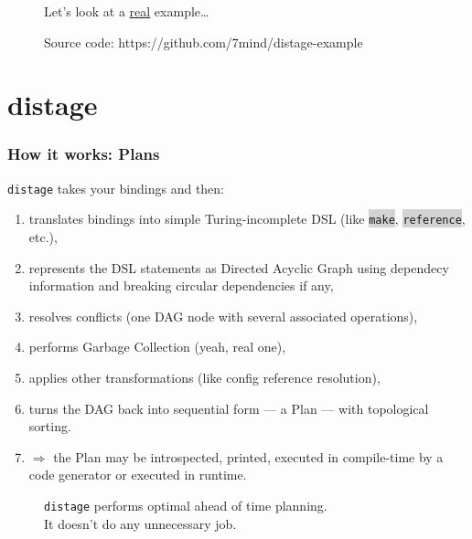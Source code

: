 \documentclass[usenames,dvipsnames,aspectratio=169]{beamer}
\newcommand{\code}[1]{\colorbox{lightgray}{\texttt{#1}}}
\newcommand{\distage}{\texttt{distage}\xspace}
\begin{document}
\begin{frame}
  \begin{figure}
  \Huge Let's look at a \underline{real} example\dots
  \end{figure}

  \begin{figure}
  Source code: https://github.com/7mind/distage-example
  \end{figure}
\end{frame}

\section{distage}
\begin{frame}
  \frametitle{How it works: Plans}
  \distage takes your bindings and then:
  \begin{enumerate}
    \item translates bindings into simple Turing-incomplete DSL (like \code{make}, \code{reference}, etc.),
    \item represents the DSL statements as Directed Acyclic Graph using dependecy information and breaking circular dependencies if any,
    \item resolves conflicts (one DAG node with several associated operations),
    \item performs Garbage Collection (yeah, real one),
    \item applies other transformations (like config reference resolution),
    \item turns the DAG back into sequential form --- a Plan --- with topological sorting.
    \item $\Rightarrow$ the Plan may be introspected, printed, executed in compile-time by a code generator or executed in runtime.
  \end{enumerate}
\end{frame}

\begin{frame}
  \begin{figure}
    \huge \distage performs optimal ahead of time planning.
    \\
    It doesn't  do any unnecessary job.
  \end{figure}
\end{frame}
\end{document}
